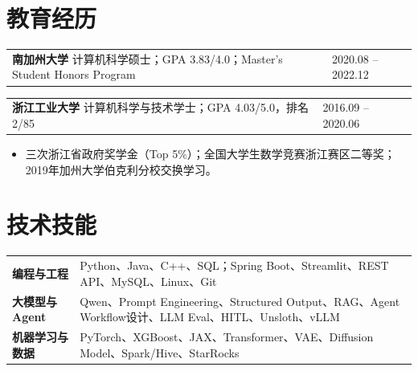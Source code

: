 \documentclass[UTF8,fontset=fandol,10pt,a4paper]{ctexart}
\makeatletter
\newcommand{\daterange}[1]{\textcolor{secondary}{\small #1}}
\newcommand{\educationentry}[3]{%
  \begin{tabularx}{\textwidth}{@{}X>{\raggedleft\arraybackslash}p{3.1cm}@{}}
    \textbf{#1} \quad #2 & \daterange{#3}
  \end{tabularx}
}
\makeatother
\begin{document}
\section{教育经历}

\educationentry{南加州大学}{计算机科学硕士；GPA 3.83/4.0；Master's Student Honors Program}{2020.08 -- 2022.12}
\vspace{0.18em}
\educationentry{浙江工业大学}{计算机科学与技术学士；GPA 4.03/5.0，排名2/85}{2016.09 -- 2020.06}
\begin{itemize}
  \item 三次浙江省政府奖学金（Top 5\%）；全国大学生数学竞赛浙江赛区二等奖；2019年加州大学伯克利分校交换学习。
\end{itemize}

\section{技术技能}

\begin{tabularx}{\textwidth}{@{}>{\bfseries}p{2.4cm}X@{}}
编程与工程 & Python、Java、C++、SQL；Spring Boot、Streamlit、REST API、MySQL、Linux、Git \\
大模型与Agent & Qwen、Prompt Engineering、Structured Output、RAG、Agent Workflow设计、LLM Eval、HITL、Unsloth、vLLM \\
机器学习与数据 & PyTorch、XGBoost、JAX、Transformer、VAE、Diffusion Model、Spark/Hive、StarRocks
\end{tabularx}
\end{document}
